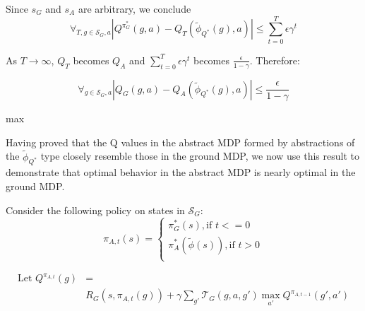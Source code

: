\documentclass{article}
\newcommand{\ep}{\widetilde \phi}
\newcommand{\epQ}{\ep_{Q^*}}
\begin{document}
Since $s_G$ and $s_A$ are arbitrary, we conclude
\begin{equation}
\forall_{T, g \in \mathcal{S}_G, a} |Q^{\pi_G^*}(g, a) - Q_T(\epQ(g), a)| \leq \sum_{t=0}^{T} \epsilon \gamma^t
\end{equation}



As $T \rightarrow \infty$, $Q_T$ becomes $Q_A$ and $\sum_{t=0}^{T} \epsilon \gamma^t$ becomes $\frac{\epsilon}{1-\gamma}$. Therefore:

\begin{equation}
\label{eq:Q*HalfResult}
\forall_{g \in \mathcal{S}_G, a} |Q_G(g, a) - Q_A(\epQ(g), a)| \leq \frac{\epsilon}{1-\gamma}
\end{equation}

max

Having proved that the Q values in the abstract MDP formed by abstractions of the $\epQ$ type closely resemble those in the ground \ac{MDP}, we now use this result to demonstrate that optimal behavior in the abstract \ac{MDP} is nearly optimal in the ground \ac{MDP}.

Consider the following policy on states in $\mathcal{S}_G$:
\begin{equation}
\pi_{A,t}(s)=
\begin{cases}
\pi_G^*(s), \text{if $t<=0$}\\
\pi_A^*(\ep(s)), \text{if $t > 0$}\\
\end{cases}
\end{equation}

\begin{align*}
\text{Let }Q^{\pi_{A,t}}(g) &= \\
&R_G(s, \pi_{A,t}(g)) + \gamma \sum_{g'}\mathcal{T}_G(g, a, g')\max_{a'}Q^{\pi_{A,t-1}}(g', a')
\end{align*}
\end{document}
